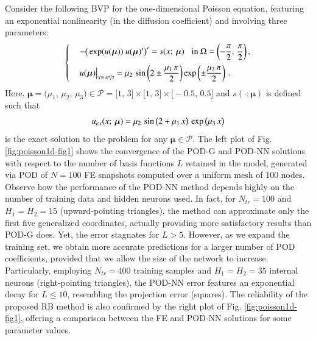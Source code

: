 \documentclass[longtitle]{elsarticle}
\numberwithin{equation}{section}
\theoremstyle{theorem}
\theoremstyle{definition}
\theoremstyle{remark}
\theoremstyle{proposition}
\numberwithin{figure}{section}
\newcommand{\bg}[1]{\boldsymbol{#1}}
\begin{document}
		Consider the following BVP for the one-dimensional Poisson equation, featuring an exponential nonlinearity (in the diffusion coefficient) and involving three parameters:
		\vspace*{-0.2cm}
		\begin{equation}
			\label{eq:poisson1d}
			\begin{cases}
				& - \big( \exp(u(\bg{\mu})) ~ u(\bg{\mu})' \big)' = s(x; \, \bg{\mu}) \hspace*{0.3cm} \text{in $\Omega = \left( -\dfrac{\pi}{2}, \, \dfrac{\pi}{2} \right)$} \, , \\[0.3cm]
				& u(\bg{\mu}) \big|_{x = \pm \nicefrac{\pi}{2}} = \mu_2 \, \sin\left( 2 \pm \dfrac{\mu_1 \, \pi}{2} \right) \exp \left( \pm \dfrac{\mu_3 \, \pi}{2} \right) \, .
			\end{cases}
			\vspace*{-0.2cm}
		\end{equation}
		Here, $\bg{\mu} = \big(\mu_1, \, \mu_2, \, \mu_3 \big) \in \mathcal{P} = \big[ 1, \, 3 \big] \times \big[ 1, \, 3 \big] \times \big[ -0.5, \, 0.5 \big]$ and $s(\cdot; \bg{\mu})$ is defined such that 
		\vspace*{-0.2cm}
		\begin{equation*}
			u_{ex}(x; \, \bg{\mu}) = \mu_2 \, \sin \big(2 + \mu_1 \, x \big) \, \exp \big( \mu_3 \, x \big) 
			\vspace*{-0.2cm}
		\end{equation*}
		is the exact solution to the problem for any $\bg{\mu} \in \mathcal{P}$. The left plot of Fig. \ref{fig:poisson1d-fig1} shows the convergence of the POD-G and POD-NN solutions with respect to the number of basis functions $L$ retained in the model, generated via POD of $N = 100$ FE snapshots computed over a uniform mesh of $100$ nodes. Observe how the performance of the POD-NN method depends highly on the number of training data and hidden neurons used. In fact, for $N_{tr} = 100$ and $H_1 = H_2 = 15$ (upward-pointing triangles), the method can approximate only the first five generalized coordinates, actually providing more satisfactory results than POD-G does. Yet, the error stagnates for $L > 5$. However, as we expand the training set, we obtain more accurate predictions for a larger number of POD coefficients, provided that we allow the size of the network to increase. Particularly, employing $N_{tr} = 400$ training samples and $H_1 = H_2 = 35$ internal neurons (right-pointing triangles), the POD-NN error features an exponential decay for $L \leq 10$, resembling the projection error (squares). The reliability of the proposed RB method is also confirmed by the right plot of Fig. \ref{fig:poisson1d-fig1}, offering a comparison between the FE and POD-NN solutions for some parameter values.
				
\end{document}
